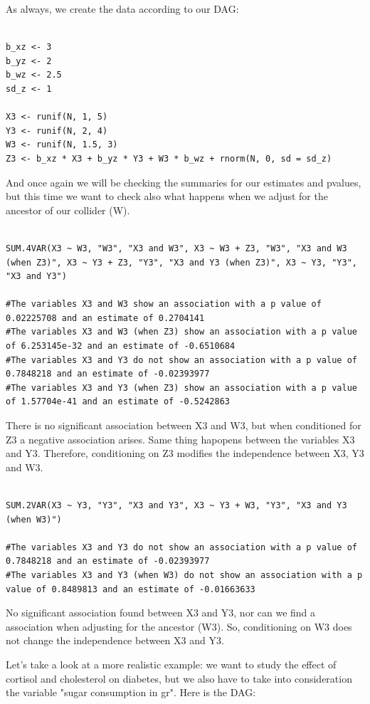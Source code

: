 \documentclass{article}
\begin{document}
As always, we create the data according to our DAG:\par

\begin{lstlisting}

b_xz <- 3 
b_yz <- 2
b_wz <- 2.5
sd_z <- 1

X3 <- runif(N, 1, 5)
Y3 <- runif(N, 2, 4)
W3 <- runif(N, 1.5, 3)
Z3 <- b_xz * X3 + b_yz * Y3 + W3 * b_wz + rnorm(N, 0, sd = sd_z)
\end{lstlisting}

And once again we will be checking the summaries for our estimates and pvalues, but this time we want to check also what happens when we adjust for the ancestor of our collider (W).\par

\begin{lstlisting}

SUM.4VAR(X3 ~ W3, "W3", "X3 and W3", X3 ~ W3 + Z3, "W3", "X3 and W3 (when Z3)", X3 ~ Y3 + Z3, "Y3", "X3 and Y3 (when Z3)", X3 ~ Y3, "Y3", "X3 and Y3")

#The variables X3 and W3 show an association with a p value of 0.02225708 and an estimate of 0.2704141 
#The variables X3 and W3 (when Z3) show an association with a p value of 6.253145e-32 and an estimate of -0.6510684 
#The variables X3 and Y3 do not show an association with a p value of 0.7848218 and an estimate of -0.02393977 
#The variables X3 and Y3 (when Z3) show an association with a p value of 1.57704e-41 and an estimate of -0.5242863 
\end{lstlisting}

There is no significant association between X3 and W3, but when conditioned for Z3 a negative association arises. Same thing hapopens between the  variables X3 and Y3. Therefore, conditioning on Z3 modifies the independence between X3, Y3 and W3.\par

\begin{lstlisting}

SUM.2VAR(X3 ~ Y3, "Y3", "X3 and Y3", X3 ~ Y3 + W3, "Y3", "X3 and Y3 (when W3)")

#The variables X3 and Y3 do not show an association with a p value of 0.7848218 and an estimate of -0.02393977 
#The variables X3 and Y3 (when W3) do not show an association with a p value of 0.8489813 and an estimate of -0.01663633 

\end{lstlisting}

No significant association found between X3 and Y3, nor can we find a  association when adjusting for the ancestor (W3). So, conditioning on W3 does not change the independence between X3 and Y3.\par
Let's take a look at a more realistic example: we want to study the effect of cortisol and cholesterol on diabetes, but we also have to take into consideration the variable "sugar consumption in gr". Here is the DAG:
\end{document}
